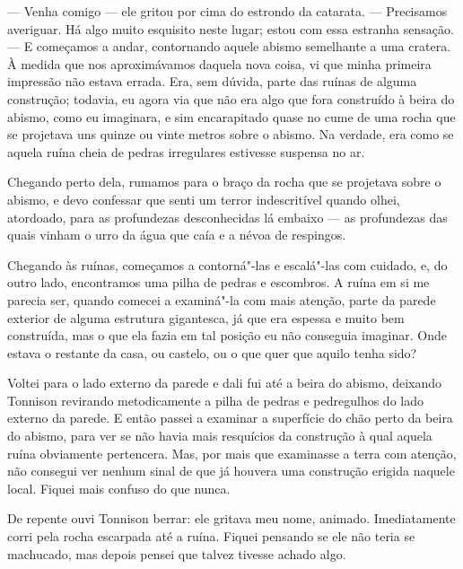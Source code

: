 --- Venha comigo --- ele gritou por cima do estrondo da catarata. --- Precisamos averiguar. Há algo muito esquisito neste lugar;
estou com essa estranha sensação. --- E começamos a andar, contornando aquele abismo semelhante a uma cratera. À medida
que nos aproximávamos daquela nova coisa, vi que minha primeira impressão não estava errada. Era, sem dúvida, parte das
ruínas de alguma construção; todavia, eu agora via que não era algo que fora construído à beira do abismo, como eu
imaginara, e sim encarapitado quase no cume de uma rocha que se projetava uns quinze ou vinte metros sobre o abismo. Na
verdade, era como se aquela ruína cheia de pedras irregulares estivesse suspensa no ar. 

Chegando perto dela, rumamos para o braço da rocha que se projetava sobre o abismo, e devo confessar que senti um terror
indescritível quando olhei, atordoado, para as profundezas desconhecidas lá embaixo --- as profundezas das quais vinham o
urro da água que caía e a névoa de respingos.

Chegando às ruínas, começamos a contorná"-las e escalá"-las com cuidado, e, do outro lado, encontramos uma pilha de pedras
e escombros. A ruína em si me parecia ser, quando comecei a examiná"-la com mais atenção, parte da parede exterior de
alguma estrutura gigantesca, já que era espessa e muito bem construída, mas o que ela fazia em tal posição eu não
conseguia imaginar. Onde estava o restante da casa, ou castelo, ou o que quer que aquilo tenha sido?

Voltei para o lado externo da parede e dali fui até a beira do abismo, deixando Tonnison revirando metodicamente a pilha
de pedras e pedregulhos do lado externo da parede. E então passei a examinar a superfície do chão perto da beira do
abismo, para ver se não havia mais resquícios da construção à qual aquela ruína obviamente pertencera. Mas, por mais
que examinasse a terra com atenção, não consegui ver nenhum sinal de que já houvera uma construção erigida naquele
local. Fiquei mais confuso do que nunca.

De repente ouvi Tonnison berrar: ele gritava meu nome, animado. Imediatamente corri pela rocha escarpada até a ruína.
Fiquei pensando se ele não teria se machucado, mas depois pensei que talvez tivesse achado algo.

